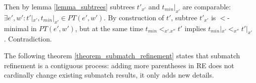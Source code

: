 \documentclass[AMA,STIX1COL]{WileyNJD-v2}
\newcommand{\PT}{PT}
\newcommand{\snorm}[2]{\|{#1}\|^{sub}_{#2}}
\begin{document}
\begin{proofEnd}
    Then by lemma \ref{lemma_subtrees} subtrees $t'_{x'}$ and $t_{min}|_{x'}$ are comparable:
    $\exists e', w' : t'|_{x'}, t_{min}|_{x'} \in \PT(e', w')$.
    By construction of $t'$, subtree $t'_{x'}$ is $<$-minimal in $\PT(e', w')$,
    but at the same time $t_{min} <_{x'.x''} t'$ implies $t_{min}|_{x'} <_{x''} t'|_{x'}$.
    Contradiction.
\end{proofEnd}

The following theorem \ref{theorem_submatch_refinement}
states that submatch refinement is a contiguous process:
adding more parentheses in RE does not cardinally change existing submatch results, it only adds new details.
\end{document}
